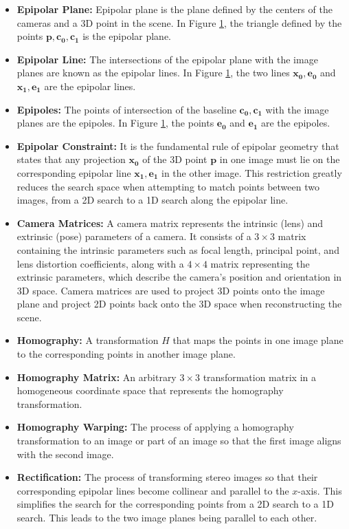 \begin{itemize}
\item \textbf{Epipolar Plane:} Epipolar plane is the plane defined by the centers of the cameras and a 3D point in the scene. In Figure \hyperref[fig:epipolar]{1}, the triangle defined by the points $\mathbf{p,c_0,c_1}$ is the epipolar plane. 
\item \textbf{Epipolar Line:} The intersections of the epipolar plane with the image planes are known as the epipolar lines. In Figure \hyperref[fig:epipolar]{1}, the two lines $\mathbf{x_0,e_0}$ and $\mathbf{x_1,e_1}$ are the epipolar lines.
\item \textbf{Epipoles:} The points of intersection of the baseline $\mathbf{c_0},\mathbf{c_1}$ with the image planes are the epipoles. In Figure \hyperref[fig:epipolar]{1}, the points $\mathbf{e_0}$ and $\mathbf{e_1}$ are the epipoles. 
\item \textbf{Epipolar Constraint:} It is the fundamental rule of epipolar geometry that states that any projection $\mathbf{x_0}$ of the 3D point $\mathbf{p}$ in one image must lie on the corresponding epipolar line $\mathbf{x_1, e_1}$ in the other image. This restriction greatly reduces the search space when attempting to match points between two images, from a 2D search to a 1D search along the epipolar line.
\item \textbf{Camera Matrices:}
A camera matrix represents the intrinsic (lens) and extrinsic (pose) parameters of a camera. It consists of a $3\times3$ matrix containing the intrinsic parameters such as focal length, principal point, and lens distortion coefficients, along with a $4\times4$ matrix representing the extrinsic parameters, which describe the camera's position and orientation in 3D space. Camera matrices are used to project 3D points onto the image plane and project 2D points back onto the 3D space when reconstructing the scene. 
\item \textbf{Homography:} A transformation $H$ that maps the points in one image plane to the corresponding points in another image plane.
\item \textbf{Homography Matrix:} An arbitrary $3\times3$ transformation matrix in a homogeneous coordinate space that represents the homography transformation.
\item \textbf{Homography Warping:} The process of applying a homography transformation to an image or part of an image so that the first image aligns with the second image. 
\item \textbf{Rectification:} The process of transforming stereo images so that their corresponding epipolar lines become collinear and parallel to the $x$-axis. This simplifies the search for the corresponding points from a 2D search to a 1D search. This leads to the two image planes being parallel to each other. 

\end{itemize}
